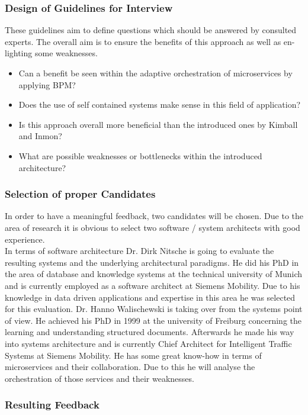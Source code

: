 \subsubsection{Design of Guidelines for Interview}
These guidelines aim to define questions which should be answered by consulted experts. The overall aim is to ensure the benefits of this approach as well as en-lighting some weaknesses. 
\begin{itemize}
    \item Can a benefit be seen within the adaptive orchestration of microservices by applying BPM?
    \item Does the use of self contained systems make sense in this field of application?
    \item Is this approach overall more beneficial than the introduced ones by Kimball and Inmon?
    \item What are possible weaknesses or bottlenecks within the introduced architecture?
\end{itemize}

\subsubsection{Selection of proper Candidates}
In order to have a meaningful feedback, two candidates will be chosen. Due to the area of research it is obvious to select two software / system architects with good experience.\newline
\\
In terms of software architecture Dr. Dirk Nitsche is going to evaluate the resulting systems and the underlying architectural paradigms. He did his PhD in the area of database and knowledge systems at the technical university of Munich and is currently employed as a software architect at Siemens Mobility. Due to his knowledge in data driven applications and expertise in this area he was selected for this evaluation.\newline
Dr. Hanno Walischewski is taking over from the systems point of view. He achieved his PhD in 1999 at the university of Freiburg concerning the learning and understanding structured documents. Afterwards he made his way into systems architecture and is currently Chief Architect for Intelligent Traffic Systems at Siemens Mobility. He has some great know-how in terms of microservices and their collaboration. Due to this he will analyse the orchestration of those services and their weaknesses.  

\subsubsection{Resulting Feedback}
\cite{dirk}
\cite{hanno}